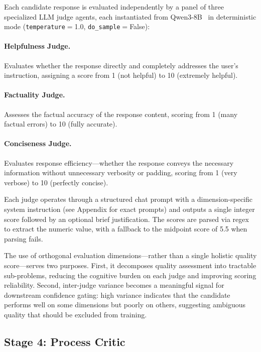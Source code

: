 \documentclass[10pt,twocolumn]{article}
\begin{document}
Each candidate response is evaluated independently by a panel of three specialized LLM judge agents, each instantiated from Qwen3-8B~\cite{qwen2025qwen3} in deterministic mode (\texttt{temperature}$=$1.0, \texttt{do\_sample}$=$False):

\paragraph{Helpfulness Judge.}
Evaluates whether the response directly and completely addresses the user's instruction, assigning a score from 1 (not helpful) to 10 (extremely helpful).

\paragraph{Factuality Judge.}
Assesses the factual accuracy of the response content, scoring from 1 (many factual errors) to 10 (fully accurate).

\paragraph{Conciseness Judge.}
Evaluates response efficiency---whether the response conveys the necessary information without unnecessary verbosity or padding, scoring from 1 (very verbose) to 10 (perfectly concise).

Each judge operates through a structured chat prompt with a dimension-specific system instruction (see Appendix for exact prompts) and outputs a single integer score followed by an optional brief justification.
The scores are parsed via regex to extract the numeric value, with a fallback to the midpoint score of 5.5 when parsing fails.

The use of orthogonal evaluation dimensions---rather than a single holistic quality score---serves two purposes.
First, it decomposes quality assessment into tractable sub-problems, reducing the cognitive burden on each judge and improving scoring reliability.
Second, inter-judge variance becomes a meaningful signal for downstream confidence gating: high variance indicates that the candidate performs well on some dimensions but poorly on others, suggesting ambiguous quality that should be excluded from training.


\subsection{Stage 4: Process Critic}
\label{sec:critic}
\end{document}
